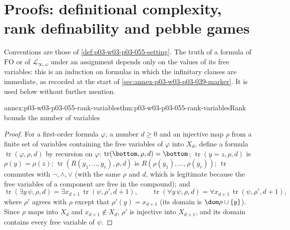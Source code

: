 \section{Proofs: definitional complexity, rank definability and pebble games}
\label{sec:annex-p03-w03-p03-055-definitional-complexity}

Conventions are those of \cref{def:p03-w03-p03-055-setting}. The truth of a
formula of \(\mathrm{FO}\) or of \(\mathcal L_{\infty,\omega}\) under an
assignment depends only on the values of its free variables: this is an
induction on formulas in which the infinitary clauses are immediate, as
recorded at the start of \cref{sec:annex-p03-w03-p03-039-marker}. It is used
below without further mention.

\begin{annexitem}{annex:p03-w03-p03-055-rank-variables}{thm:p03-w03-p03-055-rank-variables}{Rank bounds the number of variables}
\begin{proof}
For a first-order formula \(\varphi\), a number \(d\ge0\) and an injective
map \(\rho\) from a finite set of variables containing the free variables
of \(\varphi\) into \(X_d\), define a formula
\(\operatorname{tr}(\varphi,\rho,d)\) by recursion on \(\varphi\):
\(\operatorname{tr}(\bottom,\rho,d)=\bottom\);
\(\operatorname{tr}(y=z,\rho,d)\) is \(\rho(y)=\rho(z)\);
\(\operatorname{tr}(R(y_1,\ldots,y_r),\rho,d)\) is
\(R(\rho(y_1),\ldots,\rho(y_r))\); \(\operatorname{tr}\) commutes with
\(\neg,\wedge,\vee\) (with the same \(\rho\) and \(d\), which is legitimate
because the free variables of a component are free in the compound); and
\[
 \operatorname{tr}(\exists y\,\psi,\rho,d)=\exists x_{d+1}\,
 \operatorname{tr}(\psi,\rho',d+1),\qquad
 \operatorname{tr}(\forall y\,\psi,\rho,d)=\forall x_{d+1}\,
 \operatorname{tr}(\psi,\rho',d+1),
\]
where \(\rho'\) agrees with \(\rho\) except that \(\rho'(y)=x_{d+1}\) (its
domain is \(\dom\rho\cup\{y\}\)). Since \(\rho\) maps into \(X_d\) and
\(x_{d+1}\notin X_d\), \(\rho'\) is injective into \(X_{d+1}\), and its
domain contains every free variable of \(\psi\).


\end{proof}
\end{annexitem}
